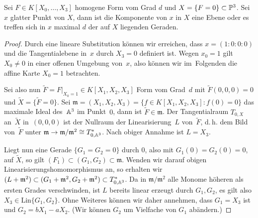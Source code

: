 \begin{theorem} \label{th:local}
Sei $F \in K[X_0, \dots, X_3]$ homogene Form vom Grad $d$ und $X = \{F = 0\} \subset \mathbb P^{3}$. Sei $x$ glatter Punkt von $X$, dann ist die Komponente von $x$ in $X$ eine Ebene oder es treffen sich in $x$ maximal $d$ der auf $X$ liegenden Geraden.
\end{theorem}
\begin{proof}
Durch eine lineare Substitution können wir erreichen, dass $x = (1:0:0:0)$ und die Tangentialebene in~$x$ durch $X_3 = 0$ definiert ist. Wegen $x_0 = 1$ gilt $X_0 \neq 0$ in einer offenen Umgebung von~$x$, also können wir im~Folgenden die affine Karte ${X_0 = 1}$ betrachten.

Sei also nun $\tilde F = \left. F \right|_{X_0=1} \in K[X_1, X_2, X_3]$ Form vom Grad~$d$ mit $\tilde F(0,0,0) = 0$ und $\tilde X = \{\tilde F = 0\}$. Sei $\mathfrak m = (X_1, X_2, X_3) = \{ f \in K[X_1, X_2, X_3] : f(0) = 0 \}$ das maximale Ideal des~$\mathbb A^{3}$ im Punkt~$0$, dann ist $\tilde F \in \mathfrak m$. Der Tangentialraum $T_{0,X}$ an~$\tilde X$ in~$(0,0,0)$ ist der Nullraum der Linearisierung~$L$ von~$\tilde F$, d.\,h. dem Bild von~$\tilde F$ unter $\mathfrak m \rightarrow \mathfrak m/\mathfrak m^2 \cong T_{0,\mathbb A^{3}}^*$. Nach obiger Annahme ist $L = X_3$.

Liegt nun eine Gerade $\{G_1 = G_2 = 0\}$ durch $0$, also mit $G_1(0) = G_2(0) = 0$, auf $\tilde X$, so gilt $(F_1) \subset (G_1, G_2) \subset \mathfrak m$. Wenden wir darauf obigen Linearisierungshomomorphismus an, so erhalten wir $(L + \mathfrak m^2) \subset (G_1 + \mathfrak m^2, G_2 + \mathfrak m^2) \subset T_{0,\mathbb A^{3}}^*$. Da in $\mathfrak m/\mathfrak m^2$ alle Monome höheren als ersten Grades verschwinden, ist $L$ bereits linear erzeugt durch $G_1, G_2$, es gilt also $X_3 \in \mathrm{Lin}\{G_1, G_2\}$. Ohne Weiteres können wir daher annehmen, dass $G_1 = X_3$ ist und $G_2 = bX_1 - aX_2$. (Wir können $G_2$ um Vielfache von $G_1$ abändern.)


\end{proof}

